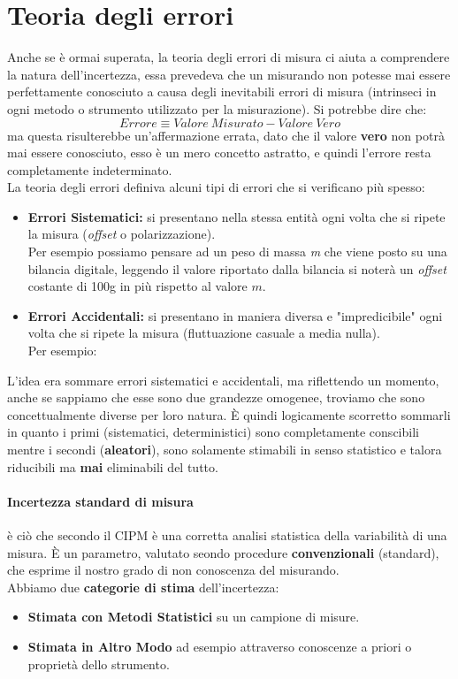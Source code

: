 \documentclass[a4paper,11pt]{report}
\begin{document}
\section{Teoria degli errori}
Anche se è ormai superata, la teoria degli errori di misura ci aiuta a comprendere la natura dell'incertezza, essa prevedeva che un misurando non potesse mai essere perfettamente conosciuto a causa degli inevitabili errori di misura (intrinseci in ogni metodo o strumento utilizzato per la misurazione). Si potrebbe dire che: $$Errore \equiv  Valore\ Misurato - Valore\ Vero$$
ma questa risulterebbe un'affermazione errata, dato che il valore \textbf{vero} non potrà mai essere conosciuto, esso è un mero concetto astratto, e quindi l'errore resta completamente indeterminato.\\
La teoria degli errori definiva alcuni tipi di errori che si verificano più spesso:
\begin{itemize}
  \item \textbf{Errori Sistematici:} si presentano nella stessa entità ogni volta che si ripete la misura (\textit{offset} o polarizzazione).\\
  Per esempio possiamo pensare ad un peso di massa \textit{m} che viene posto su una bilancia digitale, leggendo il valore riportato dalla bilancia si noterà un \textit{offset} costante di 100g in più rispetto al valore $m$.
  \item \textbf{Errori Accidentali:} si presentano in maniera diversa e "impredicibile" ogni volta che si ripete la misura (fluttuazione casuale a media nulla).\\
  Per esempio:
\end{itemize}
L'idea era sommare errori sistematici e accidentali, ma riflettendo un momento, anche se sappiamo che esse sono due grandezze omogenee, troviamo che sono concettualmente diverse per loro natura. È quindi logicamente scorretto sommarli in quanto i primi (sistematici, deterministici) sono completamente conscibili mentre i secondi (\textbf{aleatori}), sono solamente stimabili in senso statistico e talora riducibili ma \textbf{mai} eliminabili del tutto.
\paragraph*{Incertezza standard di misura} è ciò che secondo il CIPM è una corretta analisi statistica della variabilità di una misura. È un parametro, valutato seondo procedure \textbf{convenzionali} (standard), che esprime il nostro grado di non conoscenza del misurando.\\
Abbiamo due \textbf{categorie di stima} dell'incertezza:
\begin{itemize}
  \item \textbf{Stimata con Metodi Statistici} su un campione di misure.
  \item \textbf{Stimata in Altro Modo} ad esempio attraverso conoscenze a priori o proprietà dello strumento.
\end{itemize}
\end{document}
